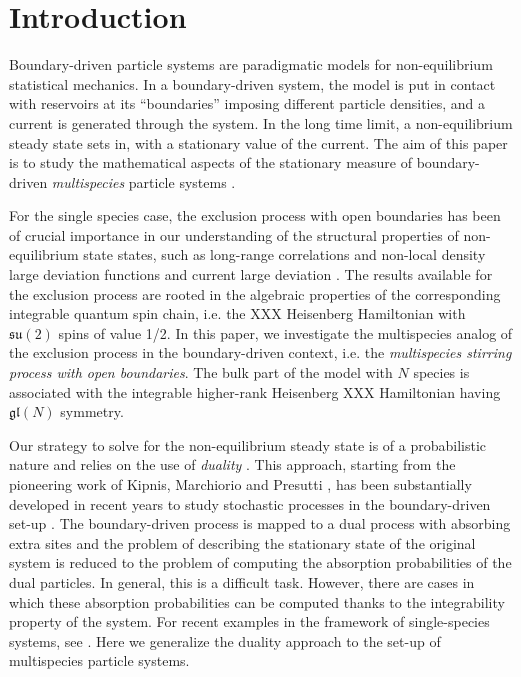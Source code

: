 \documentclass[10pt]{article}
\numberwithin{equation}{section}
\numberwithin{equation}{subsection}
\begin{document}

\newpage
\tableofcontents

 \newpage

\section{Introduction} 
Boundary-driven particle systems are paradigmatic models for non-equilibrium statistical mechanics. In a boundary-driven system, the model is put in contact with reservoirs at its ``boundaries'' imposing different particle densities, and a current is generated through the system. In the long time limit, a non-equilibrium steady state sets in, with a stationary value of the current. The aim of this paper is to study the mathematical aspects of the stationary measure of boundary-driven {\em multispecies} particle systems \cite{schutz2017kardar, vanicat2017exact, crampe2016integrable, finn2018matrix, floreani2022switching, casini2022uphill, casini2023density, redig2022ergodic, redig2023equilibrium, chatterjee2023multi, zhou2021orthogonal, franceschini2022orthogonal}.

For the single species case, the exclusion process with open boundaries \cite{derrida1993exact} has been of crucial importance in our understanding of the structural properties of non-equilibrium state states, such as long-range correlations \cite{spohn1983long} and non-local density large deviation functions \cite{derrida2007non,derrida1998exact} and current large deviation \cite{mallick2022exact,bodineau2005current}. The results available for the exclusion process are rooted in the algebraic properties of the corresponding integrable quantum spin chain, i.e. the XXX Heisenberg Hamiltonian with $\mathfrak{su}(2)$ spins of value 1/2.
In this paper, we investigate the multispecies analog of the exclusion process in the boundary-driven context, i.e. the {\em  multispecies stirring process with open boundaries}. The bulk part of the model with $N$ species is associated with the integrable higher-rank
Heisenberg XXX Hamiltonian having  $\mathfrak{gl}(N)$ symmetry.

Our strategy to solve for the non-equilibrium steady state is of a probabilistic nature and relies on the use of {\em duality} \cite{schutzSandow}. This approach, starting from the pioneering work of Kipnis, Marchiorio and Presutti \cite{KMP}, 
has been substantially developed in recent years to study stochastic processes in the boundary-driven set-up \cite{giardina2009duality,carinci2013duality,frassek2020duality,carinci2023open}. 
The boundary-driven process is mapped to a dual process with absorbing extra sites and the problem of describing the stationary state of the original system
is reduced to the problem of computing the absorption probabilities of the dual particles. 
In general, this is a difficult task. However, there are cases in which these absorption
probabilities can be computed thanks to the integrability property of the system.
For recent examples in the framework of single-species systems, see \cite{frassek2020eigenstates, frassek2022exact, frassek2020non, floreani2023non}.
Here we generalize the duality approach to the set-up of multispecies particle systems.
\end{document}
